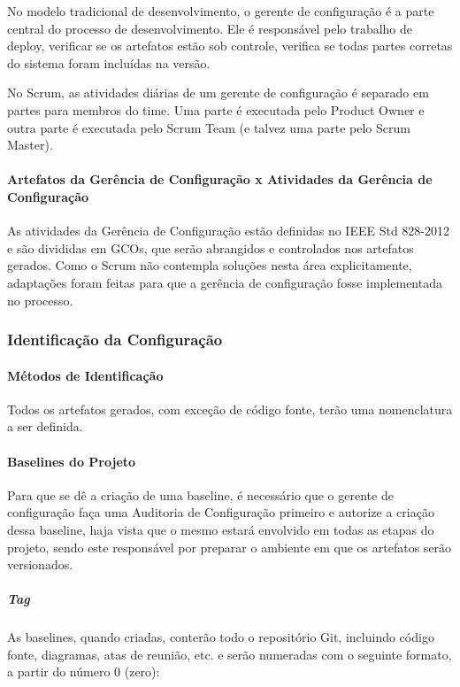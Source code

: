 No modelo tradicional de desenvolvimento, o gerente de configuração é a parte central do processo de desenvolvimento. Ele é responsável pelo trabalho de deploy, verificar se os artefatos estão sob controle, verifica se todas partes corretas do sistema foram incluídas na versão.

No Scrum, as atividades diárias de um gerente de configuração é separado em partes para membros do time. Uma parte é executada pelo Product Owner e outra parte é executada pelo Scrum Team (e talvez uma parte pelo Scrum Master).

\paragraph{Artefatos da Gerência de Configuração x Atividades da Gerência de Configuração} 

As atividades da Gerência de Configuração estão definidas no IEEE Std 828-2012 \cite{6170935} e são divididas em GCOs, que serão abrangidos e controlados nos artefatos gerados. Como o Scrum não contempla soluções nesta área explicitamente, adaptações foram feitas para que a gerência de configuração fosse implementada no processo.


 \subsubsection{Identificação da Configuração}

 \paragraph{Métodos de Identificação}

 Todos os artefatos gerados, com exceção de código fonte, terão uma nomenclatura a ser definida.



\paragraph{Baselines do Projeto}

Para que se dê a criação de uma baseline, é necessário que o gerente de configuração faça uma Auditoria de Configuração primeiro e autorize a criação dessa baseline, haja vista que o mesmo estará envolvido em todas as etapas do projeto, sendo este responsável por preparar o ambiente em que os artefatos serão versionados.

\subparagraph{Tag}

As baselines, quando criadas, conterão todo o repositório Git, incluindo código fonte, diagramas, atas de reunião, etc. e serão numeradas com o seguinte formato, a partir do número 0 (zero):

